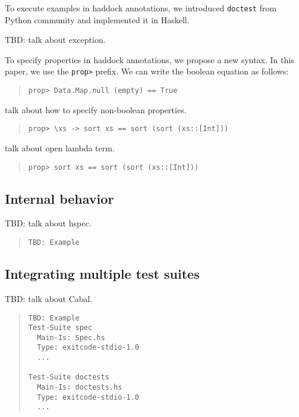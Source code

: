 \documentclass[preprint]{sigplanconf}
\begin{document}
To execute examples in haddock annotations, we introduced {\tt doctest} from Python community and implemented it in Haskell.

TBD: talk about exception.

To specify properties in haddock annotations, we propose a new syntax. In this paper, we use the {\tt prop>} prefix. We can write the boolean equation as follows:

\begin{quote}
\begin{verbatim}
prop> Data.Map.null (empty) == True
\end{verbatim}
\end{quote}

\noindent talk about how to specify non-boolean properties.

\begin{quote}
\begin{verbatim}
prop> \xs -> sort xs == sort (sort (xs::[Int]))
\end{verbatim}
\end{quote}

\noindent talk about open lambda term.

\begin{quote}
\begin{verbatim}
prop> sort xs == sort (sort (xs::[Int]))
\end{verbatim}
\end{quote}

\subsection{Internal behavior}

TBD: talk about hspec.

\begin{quote}
\begin{verbatim}
TBD: Example
\end{verbatim}
\end{quote}

\subsection{Integrating multiple test suites}

TBD: talk about Cabal.

\begin{quote}
\begin{verbatim}
TBD: Example
Test-Suite spec
  Main-Is: Spec.hs
  Type: exitcode-stdio-1.0
  ...

Test-Suite doctests
  Main-Is: doctests.hs
  Type: exitcode-stdio-1.0
  ...
\end{verbatim}
\end{quote}
\end{document}
